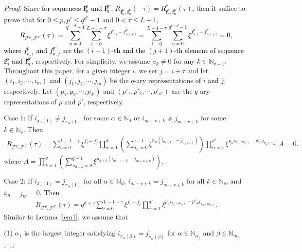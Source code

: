 \documentclass[11pt]{article}
\newcommand{\2} {$2$-to-$1$}
\begin{document}
\begin{proof}
\textcolor{black}{Since for sequences $\mathbf{f}^{p}_{n} $ and $\mathbf{f}^{p'}_{n}$, $R_{\mathbf{f}^{p'}_{n},\mathbf{f}^{p}_{n}}(-\tau)=R^{*}_{\mathbf{f}^{p}_{n},\mathbf{f}^{p'}_{n}}(\tau)$, then it suffice to prove that for $0\leq p, p' \leq q^{d'}-1$ and $0<\tau\leq L-1$,
	$$R_{\mathcal{F}^{p},\mathcal{F}^{p'}}(\tau)=\sum^{q^{v+d}-1}_{n=0}\sum^{L-1-\tau}_{i=0}\xi^{f^{p}_{n,i}-f^{p'}_{n,i+\tau}}
	=\sum^{L-1-\tau}_{i=0}
	\sum^{q^{v+d}-1}_{n=0}\xi^{f^{p}_{n,i}-f^{p'}_{n,i+\tau}}=0,$$ where $ f^{p}_{n,i} $ and $ f^{p'}_{n,j} $ are the $ (i+1) $-th and the $ (j+1) $-th
	element of sequence $ \mathbf{f}^{p}_{n} $ and $ \mathbf{f}^{p'}_{n} $, respectively. }	
	For simplicity, we assume $a_k\neq 0$ for any \textcolor{black}{$k\in \mathbb{N}_{v-1}$}.
	Throughout this paper, for a given integer $ i $, we set $ j=i+\tau $ and let $ (i_1,i_2,\cdots,i_m) $ and $ (j_1,j_2,\cdots,j_m) $ be the $ q $-ary representations of $ i $ and $ j $, respectively. Let $(p_{1},p_{2},\cdots,p_{d'})$ and $(p'_{1},p'_{2},\cdots,p'_{d'})$ are the $q$-ary representations of $p$ and $p'$, respectively.

	
	Case 1: If $i_{\pi_{\alpha}(1)}\neq j_{\pi_{\alpha}(1)}$ for some  $\alpha\in \mathbb{N}_{d}$ or $i_{m-v+k}\neq j_{m-v+k}$ for some   $k \in \mathbb{N}_{v}.$ Then
	\begin{align*}
		R_{\mathcal{F}^{p},\mathcal{F}^{p'}}(\tau)=\sum_{i=0}^{L-1-\tau}\xi^{f_i-f_j}\prod_{\alpha=1}^{d}\left( \sum_{n_{\alpha}=0}^{q-1}\xi^{n_{\alpha}\left( i_{\pi_{\alpha}(1)}- j_{\pi_{\alpha}(1)}\right)}\right)\prod_{\alpha=1}^{d'}\xi^{ p_{\alpha}i_{\pi_{\alpha}(m_{\alpha})}- p'_{\alpha}j_{\pi_{\alpha}(m_{\alpha})} }A=0.
	\end{align*}
	where $ A=\prod_{k=1}^{v}\left( \sum_{n_{d+k}=0}^{q-1}\xi^{n_{d+k}(i_{m-v+k}- j_{m-v+k})}\right) $.
	
	Case 2: If $i_{\pi_{\alpha}(1)}= j_{\pi_{\alpha}(1)}$ for all  $\alpha\in \mathbb{N}_{d}$, $i_{m-v+k}= j_{m-v+k}$ for all $k \in\mathbb{N}_v$, and $ i_m=j_m=0. $ 
	Then \begin{align*}
		R_{\mathcal{F}^{p},\mathcal{F}^{p'}}(\tau)=q^{d+v}\sum_{i=0}^{L-1-\tau}\xi^{f_i-f_j}\prod_{\alpha=1}^{d'}\xi^{ p_{\alpha}i_{\pi_{\alpha}(m_{\alpha})}- p'_{\alpha}j_{\pi_{\alpha}(m_{\alpha})} }.
	\end{align*}
Similar to Lemma \ref{lem1}, we assume that
	
	(1) $\alpha_{1} $ is the largest integer satisfying
	$ i_{\pi_{\alpha}(\beta)}= j_{\pi_{\alpha}(\beta)} $ for
	$ \alpha\in \mathbb{N}_{\alpha_1}$ and $ \beta\in \mathbb{N}_{m_{\alpha}}$.
 

\end{proof}
\end{document}
